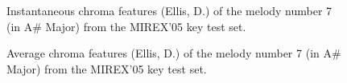 \documentclass{article}
\begin{document}
\begin{figure}
 \centerline{}
 \caption{Instantaneous chroma features (Ellis, D.) of the melody number 7 (in A\# Major) from the MIREX'05 key test set.}
 \label{fig:chroma07ellis}
\end{figure}

\begin{figure}
 \centerline{}
 \caption{Average chroma features (Ellis, D.) of the melody number 7 (in A\# Major) from the MIREX'05 key test set.}
 \label{fig:averagechroma07ellis}
\end{figure}
\end{document}
